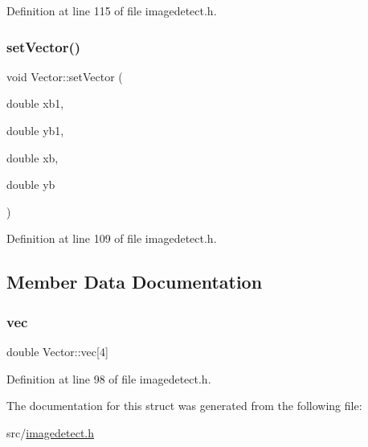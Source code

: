 Definition at line 115 of file imagedetect.\+h.

\mbox{\label{struct_vector_a07b5927e2fd524265a592b8c911a9231}} 
\subsubsection{\texorpdfstring{setVector()}{setVector()}}
{\footnotesize\ttfamily void Vector\+::set\+Vector (\begin{DoxyParamCaption}\item[{double}]{xb1,  }\item[{double}]{yb1,  }\item[{double}]{xb,  }\item[{double}]{yb }\end{DoxyParamCaption})\hspace{0.3cm}{\ttfamily [inline]}}



Definition at line 109 of file imagedetect.\+h.



\subsection{Member Data Documentation}
\mbox{\label{struct_vector_a9cb2759ae83b5b1da332646ec8cb1414}} 
\subsubsection{\texorpdfstring{vec}{vec}}
{\footnotesize\ttfamily double Vector\+::vec\mbox{[}4\mbox{]}}



Definition at line 98 of file imagedetect.\+h.



The documentation for this struct was generated from the following file\+:\begin{DoxyCompactItemize}
\item 
src/\mbox{\hyperlink{imagedetect_8h}{imagedetect.\+h}}\end{DoxyCompactItemize}
